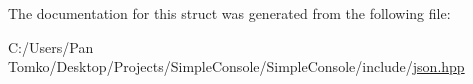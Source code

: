 The documentation for this struct was generated from the following file\+:\begin{DoxyCompactItemize}
\item 
C\+:/\+Users/\+Pan Tomko/\+Desktop/\+Projects/\+Simple\+Console/\+Simple\+Console/include/\mbox{\hyperlink{json_8hpp}{json.\+hpp}}\end{DoxyCompactItemize}
